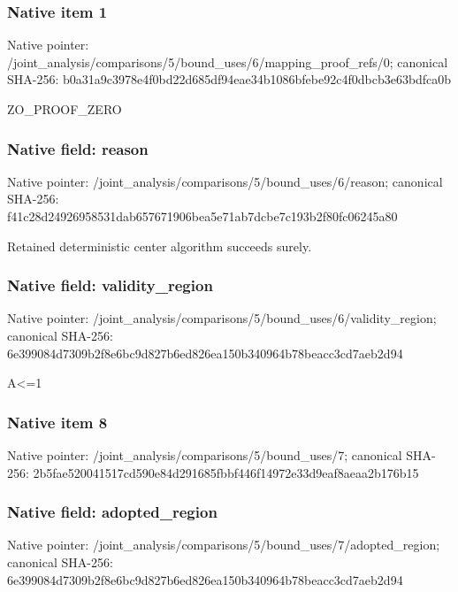 \documentclass[10pt,a4paper]{article}
\begin{document}
\subsubsection{Native item 1}
Native pointer: /joint\_\allowbreak{}analysis/comparisons/5/bound\_\allowbreak{}uses/6/mapping\_\allowbreak{}proof\_\allowbreak{}refs/0; canonical SHA-256: b0a31a9c3978e4f0bd22d685df94eae34b1086bfebe92c4f0dbcb3e63bdfca0b

\begingroup\raggedright\sloppy ZO\_\allowbreak{}PROOF\_\allowbreak{}ZERO\par\endgroup

\subsubsection{Native field: reason}
Native pointer: /joint\_\allowbreak{}analysis/comparisons/5/bound\_\allowbreak{}uses/6/reason; canonical SHA-256: f41c28d24926958531dab657671906bea5e71ab7dcbe7c193b2f80fc06245a80

\begingroup\raggedright\sloppy Retained deterministic center algorithm succeeds surely.\par\endgroup

\subsubsection{Native field: validity\_\allowbreak{}region}
Native pointer: /joint\_\allowbreak{}analysis/comparisons/5/bound\_\allowbreak{}uses/6/validity\_\allowbreak{}region; canonical SHA-256: 6e399084d7309b2f8e6bc9d827b6ed826ea150b340964b78beacc3cd7aeb2d94

\begingroup\raggedright\sloppy A<=\allowbreak{}1\par\endgroup

\subsubsection{Native item 8}
Native pointer: /joint\_\allowbreak{}analysis/comparisons/5/bound\_\allowbreak{}uses/7; canonical SHA-256: 2b5fae520041517cd590e84d291685fbbf446f14972e33d9eaf8aeaa2b176b15

\subsubsection{Native field: adopted\_\allowbreak{}region}
Native pointer: /joint\_\allowbreak{}analysis/comparisons/5/bound\_\allowbreak{}uses/7/adopted\_\allowbreak{}region; canonical SHA-256: 6e399084d7309b2f8e6bc9d827b6ed826ea150b340964b78beacc3cd7aeb2d94
\end{document}
